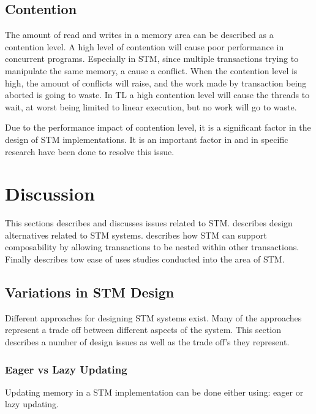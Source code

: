 \subsection{Contention}
The amount of read and writes in a memory area can be described as a contention level\cite[p. 2084]{herlihy2011tm}. A high level of contention will cause poor performance in concurrent programs. Especially in \ac{STM}, since multiple transactions trying to manipulate the same memory, a cause a conflict. When the contention level is high, the amount of conflicts will raise, and the work made by transaction being aborted is going to waste. In \ac{TL} a high contention level will cause the threads to wait, at worst being limited to linear execution, but no work will go to waste. 

Due to the performance impact of contention level, it is a significant factor in the design of \ac{STM} implementations. It is an important factor in \cite{harris2003language} and in \cite{herlihy2008transactional} specific research have been done to resolve this issue.

\section{Discussion}
\label{sec:stm_discussion}
This sections describes and discusses issues related to \ac{STM}.  describes design alternatives related to \ac{STM} systems.  describes how \ac{STM} can support composability by allowing transactions to be nested within other transactions. Finally  describes tow ease of uses studies conducted into the area of \ac{STM}.

\subsection{Variations in \ac{STM} Design}\label{subsec:stm:variations_in_design}
Different approaches for designing \ac{STM} systems exist. Many of the approaches represent a trade off between different aspects of the system. This section describes a number of design issues as well as the trade off's they represent.

\subsubsection{Eager vs Lazy Updating}
Updating memory in a \ac{STM} implementation can be done either using: eager or lazy updating.

